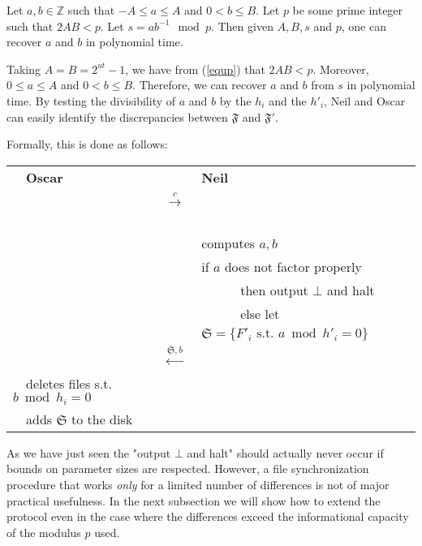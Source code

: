 \documentclass[11pt]{llncs}
\begin{document}
\begin{theorem}
\label{theo}
Let $a,b \in {\mathbb Z}$ such that $-A \leq a \leq A$ and $0<b \leq B$. Let $p$ be some prime integer such that
$2AB<p$. Let $s=a b^{-1} \mod p$.
Then given $A,B,s$ and $p$, one can recover $a$ and $b$ in polynomial time.
\end{theorem}

Taking $A=B=2^{ut}-1$, we have from (\ref{equp}) that $2AB<p$. Moreover, $0 \leq a \leq A$ and $0 <b \leq B$. Therefore, we can
recover $a$ and $b$ from $s$ in polynomial time. By testing the divisibility of $a$ and $b$ by the $h_i$ and the $h'_i$, Neil and Oscar can
easily identify the discrepancies between $\mathfrak{F}$ and $\mathfrak{F}'$.\smallskip

Formally, this is done as follows:\smallskip

\begin{center}
\begin{tabular}{|lcl|}\hline
~~{\bf Oscar}                       &                                                      &   {\bf Neil}~\\
                                   &~~{{\LARGE $\stackrel{c}{\longrightarrow}$}}~~        &   \\
                                   &                                                      &computes $a,b$~\\
                                   &                                                      &if $a$ does not factor properly~\\
                                   &                                                      &~~~~~~then output $\bot$ and halt~\\
                                   &                                                      &~~~~~~else let $\mathfrak{S}=\{F'_i \mbox{~s.t.~} a \bmod h'_i =0\}$~~\\
                                   &~~{\LARGE $\stackrel{\mathfrak{S},b}{\longleftarrow}$}&\\
~~deletes files s.t. $b \bmod h_i =0$&                                                      &\\
~~adds $\mathfrak{S}$ to the disk    &                                                      &\\\hline
\end{tabular}
\end{center}

As we have just seen the "output $\bot$ and halt" should actually never occur if bounds on parameter sizes are respected. However, a file synchronization procedure that works {\sl only} for a limited number of differences is not of major practical usefulness. In the next subsection we will show how to extend the protocol even in the case where the differences exceed the informational capacity of the modulus $p$ used.
\end{document}
